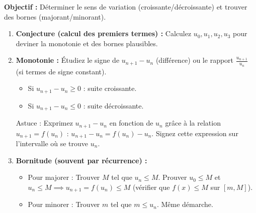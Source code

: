 \documentclass[11pt]{article}
\newcommand{\cle}[1]{{\popxbold\color{popdark}#1}}
\begin{document}
\begin{methode}
\textbf{Objectif :} Déterminer le sens de variation (croissante/décroissante) et trouver des bornes (majorant/minorant).
\begin{enumerate}
    \item \textbf{Conjecture (calcul des premiers termes) :} Calculez $u_0, u_1, u_2, u_3$ pour deviner la monotonie et des bornes plausibles.
    \item \textbf{Monotonie :} Étudiez le signe de $u_{n+1} - u_n$ (différence) ou le rapport $\frac{u_{n+1}}{u_n}$ (si termes de signe constant).
        \begin{itemize}
            \item Si $u_{n+1} - u_n \ge 0$ : suite croissante.
            \item Si $u_{n+1} - u_n \le 0$ : suite décroissante.
        \end{itemize}
        \cle{Astuce :} Exprimez $u_{n+1}-u_n$ en fonction de $u_n$ grâce à la relation $u_{n+1}=f(u_n)$ : $u_{n+1}-u_n = f(u_n)-u_n$. Signez cette expression sur l'intervalle où se trouve $u_n$.
    \item \textbf{Bornitude (souvent par récurrence) :}
        \begin{itemize}
            \item Pour majorer : Trouver $M$ tel que $u_n \le M$. Prouver $u_0 \le M$ et $u_n \le M \implies u_{n+1} = f(u_n) \le M$ (vérifier que $f(x) \le M$ sur $[m, M]$).
            \item Pour minorer : Trouver $m$ tel que $m \le u_n$. Même démarche.
        \end{itemize}
\end{enumerate}
\end{methode}
\end{document}
